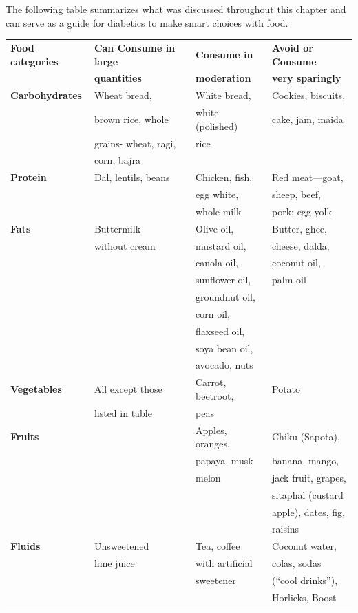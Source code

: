 The following table summarizes what was discussed throughout this chapter and can serve as a guide for diabetics to make smart choices with food.

\begin{longtable}{|l|l|l|l|}
\hline
\textbf{Food categories} & \textbf{Can Consume in large} & \textbf{Consume in} & \textbf{Avoid or Consume}\\
 & \textbf{quantities} & \textbf{moderation} & \textbf{very sparingly}\\
\hline
\textbf{Carbohydrates} & Wheat bread, & White bread, & Cookies, biscuits,\\
 & brown rice, whole & white (polished) & cake, jam, maida\\
 & grains- wheat, ragi, & rice & \\
 & corn, bajra &  & \\
\hline
\textbf{Protein} & Dal, lentils, beans & Chicken, fish, & Red meat—goat,\\
 &  & egg white, & sheep, beef,\\
 &  & whole milk & pork; egg yolk\\
\hline
\textbf{Fats} & Buttermilk & Olive oil, & Butter, ghee,\\
 & without cream & mustard oil, & cheese, dalda,\\
 &  & canola oil, & coconut oil,\\
 &  & sunflower oil, & palm oil\\
 &  & groundnut oil, & \\
 &  & corn oil, & \\
 &  & flaxseed oil, & \\
 &  & soya bean oil, & \\
 &  & avocado, nuts & \\
\hline
\textbf{Vegetables} & All except those & Carrot, beetroot, & Potato\\
 & listed in table & peas & \\
\hline
\textbf{Fruits} &  & Apples, oranges, & Chiku (Sapota),\\
 &  & papaya, musk & banana, mango,\\
 &  & melon & jack fruit, grapes,\\
 &  &  & sitaphal (custard\\
 &  &  & apple), dates, fig,\\
 &  &  & raisins\\
\hline
\textbf{Fluids} & Unsweetened & Tea, coffee & Coconut water,\\
 & lime juice & with artificial & colas, sodas\\
 &  & sweetener & (“cool drinks”),\\
 &  &  & Horlicks, Boost\\
\hline
\end{longtable}


